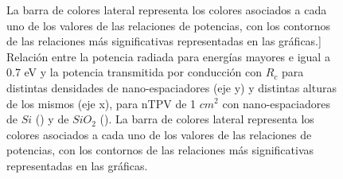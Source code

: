 \begin{figure} [h]
	La barra de colores lateral representa los colores asociados a cada uno de los valores de las relaciones de potencias, con los contornos de las relaciones más significativas representadas en las gráficas.]{\small
	Relación entre la potencia radiada para energías mayores e igual a 0.7 eV y la potencia transmitida por conducción con $R_c$ para distintas densidades de nano-espaciadores (eje y) y distintas alturas de los mismos (eje x), para nTPV de 1 $cm^2$ con nano-espaciadores de $Si$ () y de $SiO_2$ (). 
	La barra de colores lateral representa los colores asociados a cada uno de los valores de las relaciones de potencias, con los contornos de las relaciones más significativas representadas en las gráficas.
	}%
	\label{fig:prc_SiCXX}%
\end{figure}